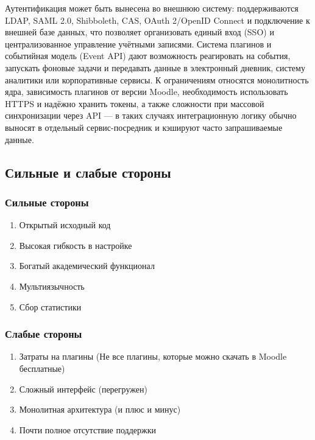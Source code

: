 \documentclass[a4paper, 14pt]{extarticle}
\begin{document}
Аутентификация может быть вынесена во внешнюю систему: поддерживаются
LDAP, SAML 2.0, Shibboleth, CAS, OAuth 2/OpenID Connect и подключение
к внешней базе данных, что позволяет организовать единый вход (SSO) и
централизованное управление учётными записями. Система плагинов и
событийная модель (Event API) дают возможность реагировать на
события, запускать фоновые задачи и передавать данные в электронный
дневник, систему аналитики или корпоративные сервисы. К ограничениям
относятся монолитность ядра, зависимость плагинов от версии Moodle,
необходимость использовать HTTPS и надёжно хранить токены, а также
сложности при массовой синхронизации через API — в таких случаях
интеграционную логику обычно выносят в отдельный сервис-посредник и
кэшируют часто запрашиваемые данные.
\newpage
{}
\subsection{Сильные и слабые стороны}
\subsubsection{Сильные стороны}
\begin{enumerate}
  \item Открытый исходный код
  \item Высокая гибкость в настройке
  \item Богатый академический функционал
  \item Мультиязычность
  \item Сбор статистики
\end{enumerate}
\subsubsection{Слабые стороны}
\begin{enumerate}
  \item Затраты на плагины (Не все плагины, которые можно скачать в
    Moodle бесплатные)
  \item Сложный интерфейс (перегружен)
  \item Монолитная архитектура (и плюс и минус)
  \item Почти полное отсутствие поддержки
\end{enumerate}
\end{document}
